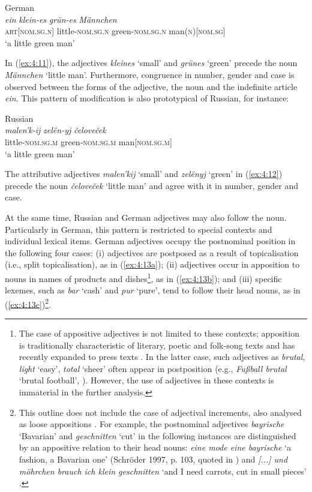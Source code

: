 \ea
\label{ex:4:11}
German \citep[1991]{ids-3-1997}\\
\textit{ein} \textit{klein-es} \textit{grün-es} \textit{Männchen}\\
	\textsc{art[nom.sg.n]} little-\textsc{nom.sg.n} green-\textsc{nom.sg.n} man(\textsc{n})[\textsc{nom.sg}]\\
\glt `a little green man'
\z

\noindent In (\ref{ex:4:11}), the adjectives \textit{kleines} `small' and \textit{grünes} `green' precede the noun \textit{Männchen} `little man'. Furthermore, congruence in number, gender and case is observed between the forms of the adjective, the noun and the indefinite article \textit{ein}. This pattern of modification is also prototypical of Russian, for instance: 

\ea
\label{ex:4:12}
Russian\\
\textit{malen'k-ij} \textit{zelën-yj} \textit{čeloveček}\\
	little-\textsc{nom.sg.m} green-\textsc{nom.sg.m} man[\textsc{nom.sg.m}]\\
\glt `a little green man'
\z

\noindent The attributive adjectives \textit{malen'kij} `small' and \textit{zelënyj} `green' in (\ref{ex:4:12}) precede the noun \textit{čeloveček} `little man' and agree with it in number, gender and case. 

At the same time, Russian and German adjectives may also follow the noun. Particularly in German, this pattern is restricted to special contexts and individual lexical items. German adjectives occupy the postnominal position in the following four cases: (i) adjectives are postposed as a result of topicalisation (i.e., split topicalisation), as in (\ref{ex:4:13a}); (ii) adjectives occur in apposition to nouns in names of products and dishes\footnote{The case of appositive adjectives is not limited to these contexts; apposition is traditionally characteristic of literary, poetic and folk-song texts \citep[cf.][1991]{ids-3-1997} and has recently expanded to press texts \citep{duerscheid-2002}. In the latter case, such adjectives as \textit{brutal}, \textit{light} `easy',  \textit{total} `sheer' often appear in postposition (e.g., \textit{Fußball brutal} `brutal football', \citealt[67]{duerscheid-2002}). However, the use of adjectives in these contexts is immaterial in the further analysis.}, as in (\ref{ex:4:13b}); and (iii) specific lexemes, such as \textit{bar} `cash' and \textit{pur} `pure', tend to follow their head nouns, as in (\ref{ex:4:13c})\footnote{This outline does not include the case of adjectival increments, also analysed as loose appositions \citep[654]{auer-increm}. For example, the postnominal adjectives \textit{bayrische} `Bavarian' and \textit{geschnitten} `cut' in the following instances are distinguished by an appositive relation to their head nouns: \textit{eine mode eine bayrische} `a fashion, a Bavarian one' (Schröder 1997, p. 103, quoted in \citealt[142]{schwitalla-2006}) and \textit{[...] und möhrchen brauch ich klein geschnitten} `and I need carrots, cut in small pieces' \citep[654]{auer-increm}.}.

